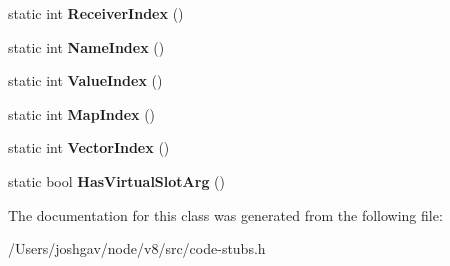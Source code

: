 \begin{DoxyCompactItemize}
\item 
static int {\bfseries Receiver\+Index} ()\hypertarget{classv8_1_1internal_1_1_store_transition_helper_ad47b353e8d1b43dcc18a5a47e8392fa2}{}\label{classv8_1_1internal_1_1_store_transition_helper_ad47b353e8d1b43dcc18a5a47e8392fa2}

\item 
static int {\bfseries Name\+Index} ()\hypertarget{classv8_1_1internal_1_1_store_transition_helper_aaa9209981f5bb03cfdc5e360d6f11925}{}\label{classv8_1_1internal_1_1_store_transition_helper_aaa9209981f5bb03cfdc5e360d6f11925}

\item 
static int {\bfseries Value\+Index} ()\hypertarget{classv8_1_1internal_1_1_store_transition_helper_a1275ac49866d2edf272111b3c5e8e16c}{}\label{classv8_1_1internal_1_1_store_transition_helper_a1275ac49866d2edf272111b3c5e8e16c}

\item 
static int {\bfseries Map\+Index} ()\hypertarget{classv8_1_1internal_1_1_store_transition_helper_a9b72bc154e7be8bd4aefdabf39bd08aa}{}\label{classv8_1_1internal_1_1_store_transition_helper_a9b72bc154e7be8bd4aefdabf39bd08aa}

\item 
static int {\bfseries Vector\+Index} ()\hypertarget{classv8_1_1internal_1_1_store_transition_helper_a4ac91230ea1399f9df6f1c0f90b62877}{}\label{classv8_1_1internal_1_1_store_transition_helper_a4ac91230ea1399f9df6f1c0f90b62877}

\item 
static bool {\bfseries Has\+Virtual\+Slot\+Arg} ()\hypertarget{classv8_1_1internal_1_1_store_transition_helper_acd1c992a828a8b72d66cbc7f6afc7126}{}\label{classv8_1_1internal_1_1_store_transition_helper_acd1c992a828a8b72d66cbc7f6afc7126}

\end{DoxyCompactItemize}


The documentation for this class was generated from the following file\+:\begin{DoxyCompactItemize}
\item 
/\+Users/joshgav/node/v8/src/code-\/stubs.\+h\end{DoxyCompactItemize}
